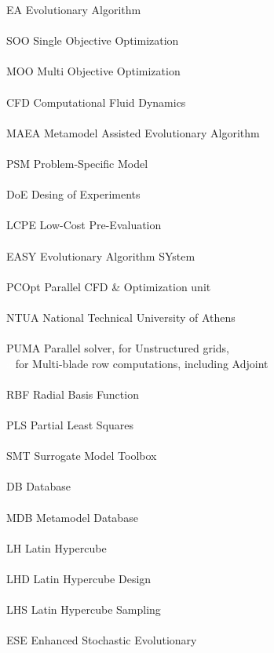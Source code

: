 \documentclass[twoside, 12pt,notitlepage]{report}
\begin{document}
EA \hfill Evolutionary Algorithm \\
\\
SOO \hfill Single Objective Optimization \\
\\
MOO \hfill Multi Objective Optimization \\
\\
CFD \hfill Computational Fluid Dynamics \\
\\
MAEA \hfill Metamodel Assisted Evolutionary Algorithm \\
\\
PSM \hfill Problem-Specific Model \\
\\
DoE \hfill Desing of Experiments \\
\\
LCPE \hfill Low-Cost Pre-Evaluation \\
\\
EASY \hfill Evolutionary Algorithm SYstem \\
\\
PCOpt \hfill Parallel CFD \& Optimization unit \\
\\
NTUA \hfill National Technical University of Athens \\
\\
PUMA \hfill Parallel solver, for Unstructured grids, \\
\textcolor{white}{a} \hfill for Multi-blade row computations,
including Adjoint \\
\\
RBF \hfill Radial Basis Function \\
\\
PLS \hfill Partial Least Squares \\
\\
SMT \hfill Surrogate Model Toolbox \\
\\
DB \hfill Database \\
\\
MDB \hfill Metamodel Database \\
\\
LH \hfill Latin Hypercube \\
\\
LHD \hfill Latin Hypercube Design \\
\\
LHS \hfill Latin Hypercube Sampling \\
\\
ESE \hfill Enhanced Stochastic Evolutionary \\
\end{document}
